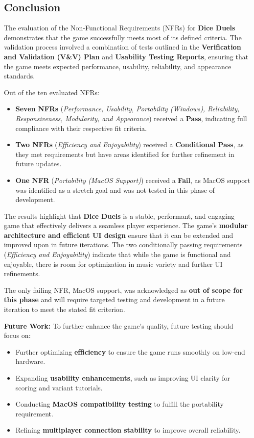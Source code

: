 \documentclass[12pt, titlepage]{article}
\begin{document}
\subsection{Conclusion}

The evaluation of the Non-Functional Requirements (NFRs) for \textbf{Dice Duels} demonstrates that the game successfully meets most of its defined criteria. The validation process involved a combination of tests outlined in the \textbf{Verification and Validation (V\&V) Plan} and \textbf{Usability Testing Reports}, ensuring that the game meets expected performance, usability, reliability, and appearance standards.

Out of the ten evaluated NFRs:
\begin{itemize}
    \item \textbf{Seven NFRs} (\textit{Performance, Usability, Portability (Windows), Reliability, Responsiveness, Modularity, and Appearance}) received a \textbf{Pass}, indicating full compliance with their respective fit criteria.
    \item \textbf{Two NFRs} (\textit{Efficiency and Enjoyability}) received a \textbf{Conditional Pass}, as they met requirements but have areas identified for further refinement in future updates.
    \item \textbf{One NFR} (\textit{Portability (MacOS Support)}) received a \textbf{Fail}, as MacOS support was identified as a stretch goal and was not tested in this phase of development.
\end{itemize}

The results highlight that \textbf{Dice Duels} is a stable, performant, and engaging game that effectively delivers a seamless player experience. The game's \textbf{modular architecture and efficient UI design} ensure that it can be extended and improved upon in future iterations. The two conditionally passing requirements (\textit{Efficiency and Enjoyability}) indicate that while the game is functional and enjoyable, there is room for optimization in music variety and further UI refinements.

The only failing NFR, MacOS support, was acknowledged as \textbf{out of scope for this phase} and will require targeted testing and development in a future iteration to meet the stated fit criterion.

\textbf{Future Work:}  
To further enhance the game’s quality, future testing should focus on:
\begin{itemize}
    \item Further optimizing \textbf{efficiency} to ensure the game runs smoothly on low-end hardware.
    \item Expanding \textbf{usability enhancements}, such as improving UI clarity for scoring and variant tutorials.
    \item Conducting \textbf{MacOS compatibility testing} to fulfill the portability requirement.
    \item Refining \textbf{multiplayer connection stability} to improve overall reliability.
\end{itemize}
\end{document}

